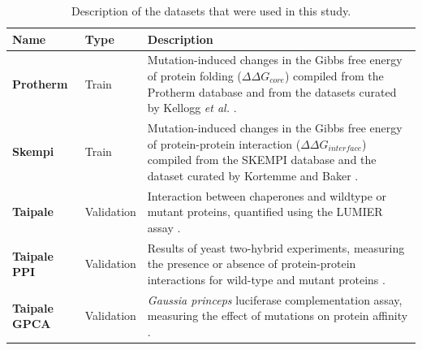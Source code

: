 
\begin{table}[tb]
	\caption[Datasets used for training, validating and testing core and interface predictors.]{Description of the datasets that were used in this study.}
	\label{tab:datasets}
	\begin{tabular}{ l |  p{1.8cm} | p{9.4cm} }
		\toprule
		Name                  & Type               & Description                                                                                                                                                                                                                                                                                                                  \\
		\midrule
		\textbf{Protherm}     & Train              & Mutation-induced changes in the Gibbs free energy of protein folding ($\Delta \Delta G_{core}$) compiled from the Protherm database \cite{bava_protherm_2004,kumar_protherm_2006} and from the datasets curated by Kellogg \textit{et al.} \cite{kellogg_role_2011}.                                                        \\
		\textbf{Skempi}       & Train              & Mutation-induced changes in the Gibbs free energy of protein-protein interaction ($\Delta \Delta G_{interface}$) compiled from the SKEMPI database \cite{moal_skempi:_2012} and the dataset curated by Kortemme and Baker \cite{kortemme_simple_2002}.                                                                      \\
		\textbf{Taipale}      & Validation         & Interaction between chaperones and wildtype or mutant proteins, quantified using the LUMIER assay \cite{sahni_widespread_2015}.                                                                                                                                                                                              \\
		\textbf{Taipale PPI}  & Validation         & Results of yeast two-hybrid experiments, measuring the presence or absence of protein-protein interactions for wild-type and mutant proteins \cite{sahni_widespread_2015}.                                                                                                                                                   \\
		\textbf{Taipale GPCA} & Validation         & \textit{Gaussia princeps} luciferase complementation assay, measuring the effect of mutations on protein affinity \cite{sahni_widespread_2015}.                                                                                                                                                                      \\

\end{tabular}
\end{table}
